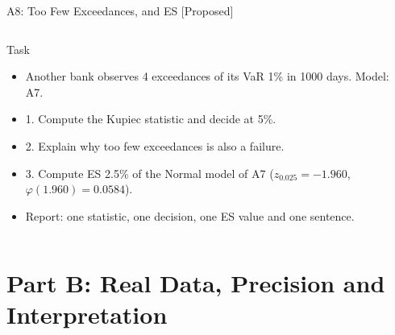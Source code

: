 \begin{frame}{A8: Too Few Exceedances, and ES [Proposed]}
\propsub
\itemsize{\scriptsize}
\begin{columns}[T]
\begin{column}{\taskw}
\begin{block}{Task}
\begin{itemize}
    \item Another bank observes 4 exceedances of its VaR 1\% in 1000 days. Model: A7.
    \item 1. Compute the Kupiec statistic and decide at 5\%.
    \item 2. Explain why too few exceedances is also a failure.
    \item 3. Compute ES 2.5\% of the Normal model of A7 ($z_{0.025} = -1.960$, $\varphi(1.960) = 0.0584$).
    \item Report: one statistic, one decision, one ES value and one sentence.
\end{itemize}
\end{block}
\end{column}
\begin{column}{\solw}
\end{column}
\end{columns}
\end{frame}


\section{Part B: Real Data, Precision and Interpretation}

